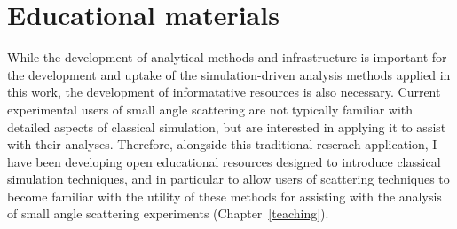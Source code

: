 \section{Educational materials}

While the development of analytical methods and infrastructure is important for the development and uptake of the simulation-driven analysis methods applied in this work, the development of informatative resources is also necessary.
Current experimental users of small angle scattering are not typically familiar with detailed aspects of classical simulation, but are interested in applying it to assist with their analyses.
Therefore, alongside this traditional reserach application, I have been developing open educational resources designed to introduce classical simulation techniques, and in particular to allow users of scattering techniques to become familiar with the utility of these methods for assisting with the analysis of small angle scattering experiments (Chapter~\ref{teaching}).
